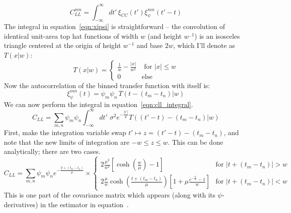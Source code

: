 \documentclass[11pt,a4paper]{article}
\begin{document}
\begin{equation}
C_{LL}^{mn}=\int_{-\infty}^{\infty}dt'\,\xi_{CC}(t')\xi_{\psi}^{mn}(t'-t)
\label{eqn:cll_integral}
\end{equation}
The integral in equation~\ref{eqn:xipsi} is straightforward -- the
convolution of identical unit-area top hat functions of width $w$ (and
height $w^{_-1}$) is an isosceles triangle centered at the origin of
height $w^{-1}$ and base $2w$, which I'll denote as $T(x|w)$:
\begin{equation}
T(x|w)= \begin{cases}
  \frac{1}{w}-\frac{|x|}{w^2} & \text{ for $|x| \le w $} \\
  0 & \text{else}
\end{cases}
\end{equation}
Now the autocorrelation of the binned transfer function with itself
is:
\begin{equation}
  \xi_{\psi}^{mn}(t)= \psi_m\psi_n\,T(t-(t_m-t_n)|w)
\end{equation}
We can now perform the integral in equation~\ref{eqn:cll_integral}.
\begin{equation}
C_{LL} = \sum\limits_{m,n}\psi_m\psi_n\int_{-\infty}^{\infty}dt'\,\,\sigma^2e^{-\frac{|t'|}{\mu}}T((t'-t)-(t_m-t_n)|w)
\end{equation}
First, make the integration variable swap $t'\mapsto z =
(t'-t)-(t_m-t_n)$, and note that the new limits of integration are $-w
 \le z \le w$. This can be done analytically; there are two cases.
\begin{equation}
  C_{LL}=
  \sum\limits_{m,n}\psi_m\psi_ne^{-\frac{|t+(t_m-t_n)}{\mu}}\times  
  \begin{cases}
    2\frac{\mu^2}{w^2}\left[\cosh\left(\frac{w}{\mu}\right)-1\right] & \text{for
      $|t+(t_m-t_n)|>w$} \\
    2\frac{\mu}{w}\cosh\left(\frac{t+(t_m-t_n)}{\mu}\right)\left[1+\mu\frac{e^{-\frac{\mu}{w}}-1}{w}\right]
      & \text{for $|t+(t_m-t_n)|<w$}
  \end{cases}
\end{equation}
This is one part of the covariance matrix which appears (along with
its $\psi$-derivatives) in the estimator in
equation~\label{eqn:estimator}.
\end{document}
